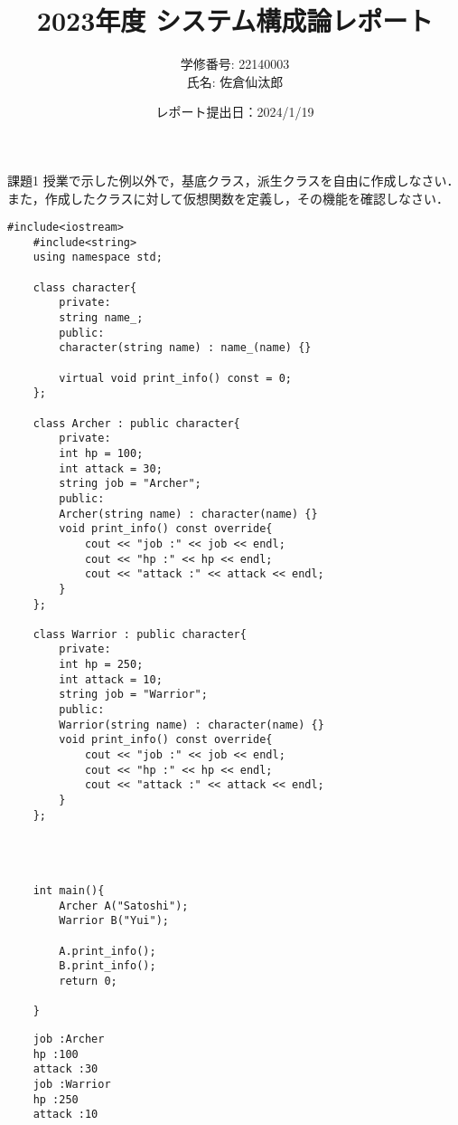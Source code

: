 \documentclass[fleqn, a4paper. 12pt]{ltjsarticle} %
\title{
2023年度 システム構成論レポート}
\author{
学修番号: 22140003 \\
氏名: 佐倉仙汰郎 \\
}
\begin{document}
\date{
レポート提出日：2024/1/19 
}
\maketitle

\newpage

\begin{itembox}[l]{課題1}
    授業で示した例以外で，基底クラス，派生クラスを自由に作成しなさい．また，作成したクラスに対して仮想関数を定義し，その機能を確認しなさい．
\end{itembox}


\begin{lstlisting}[caption=kadai1, label=program1]
    #include<iostream>
    #include<string>
    using namespace std;
    
    class character{
        private:
        string name_;
        public:
        character(string name) : name_(name) {}
    
        virtual void print_info() const = 0;
    };
    
    class Archer : public character{
        private:
        int hp = 100;
        int attack = 30;
        string job = "Archer";
        public:
        Archer(string name) : character(name) {}
        void print_info() const override{
            cout << "job :" << job << endl;
            cout << "hp :" << hp << endl;
            cout << "attack :" << attack << endl;
        }
    };
    
    class Warrior : public character{
        private:
        int hp = 250;
        int attack = 10;
        string job = "Warrior";
        public:
        Warrior(string name) : character(name) {}
        void print_info() const override{
            cout << "job :" << job << endl;
            cout << "hp :" << hp << endl;
            cout << "attack :" << attack << endl;
        }
    };
    
    
    
    
    int main(){
        Archer A("Satoshi");
        Warrior B("Yui");
    
        A.print_info();
        B.print_info();
        return 0;
    
    }
\end{lstlisting}

\begin{screen}
\begin{verbatim}
    job :Archer
    hp :100
    attack :30
    job :Warrior
    hp :250
    attack :10
\end{verbatim}
\end{screen}
\end{document}
